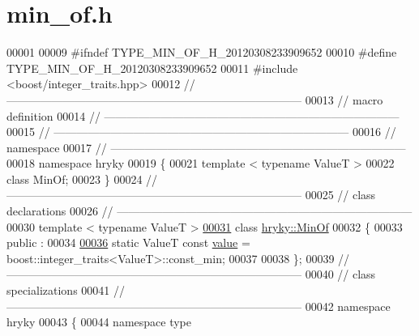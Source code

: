 \hypertarget{min__of_8h_source}{\section{min\-\_\-of.\-h}
}

\begin{DoxyCode}
00001 
00009 \textcolor{preprocessor}{#ifndef TYPE\_MIN\_OF\_H\_20120308233909652}
00010 \textcolor{preprocessor}{}\textcolor{preprocessor}{#define TYPE\_MIN\_OF\_H\_20120308233909652}
00011 \textcolor{preprocessor}{}\textcolor{preprocessor}{#include <boost/integer\_traits.hpp>}
00012 \textcolor{comment}{//
      ------------------------------------------------------------------------------}
00013 \textcolor{comment}{// macro definition}
00014 \textcolor{comment}{//
      ------------------------------------------------------------------------------}
00015 \textcolor{comment}{//
      ------------------------------------------------------------------------------}
00016 \textcolor{comment}{// namespace}
00017 \textcolor{comment}{//
      ------------------------------------------------------------------------------}
00018 \textcolor{keyword}{namespace }hryky
00019 \{
00021     \textcolor{keyword}{template} < \textcolor{keyword}{typename} ValueT >
00022     \textcolor{keyword}{class }MinOf;
00023 \}
00024 \textcolor{comment}{//
      ------------------------------------------------------------------------------}
00025 \textcolor{comment}{// class declarations}
00026 \textcolor{comment}{//
      ------------------------------------------------------------------------------}
00030 \textcolor{comment}{}\textcolor{keyword}{template} < \textcolor{keyword}{typename} ValueT >
\hypertarget{min__of_8h_source_l00031}{}\hyperlink{classhryky_1_1_min_of}{00031} \textcolor{keyword}{class }\hyperlink{classhryky_1_1_min_of}{hryky::MinOf}
00032 \{
00033 \textcolor{keyword}{public} :
00034 
\hypertarget{min__of_8h_source_l00036}{}\hyperlink{classhryky_1_1_min_of_a1bd351b969c43e1cf591ae396045b964}{00036}     \textcolor{keyword}{static} ValueT \textcolor{keyword}{const} \hyperlink{classhryky_1_1_min_of_a1bd351b969c43e1cf591ae396045b964}{value} = boost::integer\_traits<ValueT>::const\_min;
00037 
00038 \};
00039 \textcolor{comment}{//
      ------------------------------------------------------------------------------}
00040 \textcolor{comment}{// class specializations}
00041 \textcolor{comment}{//
      ------------------------------------------------------------------------------}
00042 \textcolor{keyword}{namespace }hryky
00043 \{
00044 \textcolor{keyword}{namespace }type

\end{DoxyCode}
